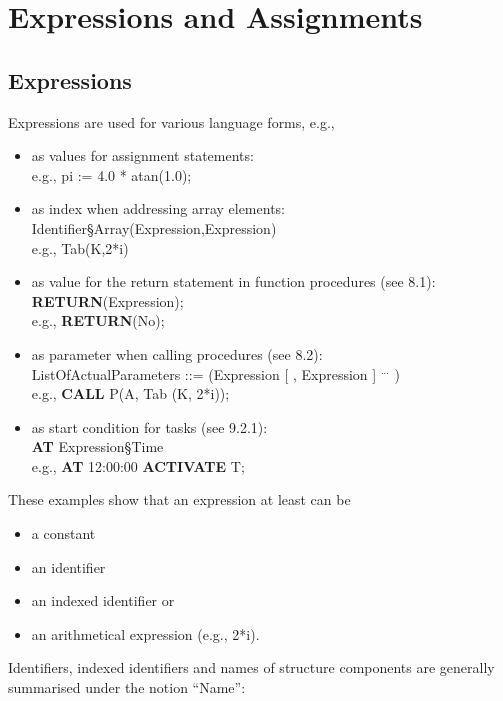 \chapter{Expressions and Assignments}   %

\section{Expressions}   %
\label{sec_expressions}

Expressions are used for various language forms, e.g.,

\begin{itemize}
\item as values for assignment statements:\\
      e.g., pi := 4.0 * atan(1.0);
\item as index when addressing array elements:\\
      Identifier\S Array(Expression,Expression)\\
      e.g., Tab(K,2*i)
\item as value for the return statement in function procedures
      (see 8.1):\\
      {\bf RETURN}(Expression);\\
      e.g., {\bf RETURN}(No);
\item as parameter when calling procedures (see 8.2):\\
      ListOfActualParameters ::= (Expression [ , Expression ] $^{...}$ )\\
      e.g., {\bf CALL} P(A, Tab (K, 2*i));
\item as start condition for tasks (see 9.2.1):\\
      {\bf AT} Expression\S Time\\
      e.g., {\bf AT} 12:00:00 {\bf ACTIVATE} T;
\end{itemize}

These examples show that an expression at least can be

\begin{itemize}
\item a constant
\item an identifier
\item an indexed identifier or
\item an arithmetical expression (e.g., 2*i).
\end{itemize}

Identifiers, indexed identifiers and names of structure components are
generally summarised under the notion ``Name'':

